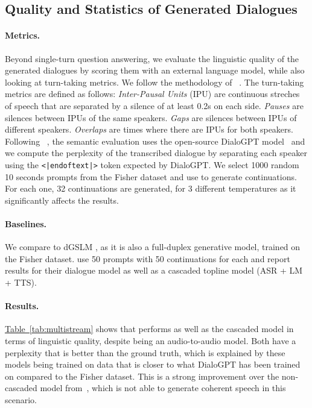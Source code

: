 \subsection{Quality and Statistics of Generated Dialogues}
\label{sec:eval_dialogues}
\paragraph{Metrics.}
Beyond single-turn question answering, we evaluate the linguistic quality of the generated dialogues by scoring them with an external language model, while also looking at turn-taking metrics. We follow the methodology of ~\citet{nguyen-etal-2023-generative}. The turn-taking metrics are defined as follows: \emph{Inter-Pausal Units} (IPU) are continuous streches of speech that are separated by a silence of at least 0.2s on each side.
\emph{Pauses} are silences between IPUs of the same speakers.
\emph{Gaps} are silences between IPUs of different speakers.
\emph{Overlaps} are times where there are IPUs for both speakers. Following ~\citet{nguyen-etal-2023-generative}, the semantic evaluation uses the open-source DialoGPT model~\cite{dialogpt} and we compute the perplexity of the transcribed dialogue by separating each speaker using the \texttt{<|endoftext|>} token expected by DialoGPT.
We select 1000 random 10 seconds prompts from the Fisher dataset and use \ours{} to generate continuations. For each one, 32 continuations are generated, for
3 different temperatures as it significantly affects the results.

\paragraph{Baselines.} We compare to dGSLM \citep{nguyen-etal-2023-generative}, as it is also a full-duplex generative model, trained on the Fisher dataset. \citet{nguyen-etal-2023-generative} use 50 prompts with 50 continuations for each and report results for their dialogue model as well as a cascaded topline model (ASR + LM + TTS).

\paragraph{Results.} \hyperref[tab:multistream]{Table~\ref{tab:multistream}} shows that \ours{} performs as well as the cascaded model in terms of linguistic quality, despite being an audio-to-audio model. Both have a perplexity that
is better than the ground truth, which is explained by these models being trained on data
that is closer to what DialoGPT has been trained on compared to the Fisher dataset. This is a strong improvement over the non-cascaded model from~\citep{nguyen-etal-2023-generative}, which is not able to generate coherent speech in this scenario.

